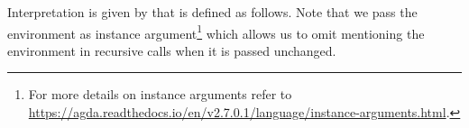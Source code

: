 Interpretation is given by  that is defined as follows.  Note that we pass
the environment as instance argument\footnote{For more details on instance arguments
refer to \url{https://agda.readthedocs.io/en/v2.7.0.1/language/instance-arguments.html}.}
which allows us to omit mentioning the environment
in recursive calls when it is passed unchanged.

